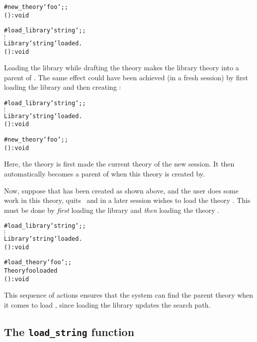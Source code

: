 \setcounter{sessioncount}{1}
\begin{session}\begin{alltt}
#new_theory `foo`;;
() : void

#load_library `string`;;
  \(\vdots\)
Library `string` loaded.
() : void
\end{alltt}\end{session}

\noindent Loading the library while drafting the theory  makes the
library theory  into a parent of .  The same effect could
have been achieved (in a fresh session) by first loading the library and then
creating :

\setcounter{sessioncount}{1}
\begin{session}\begin{alltt}
#load_library `string`;;
  \(\vdots\)
Library `string` loaded.
() : void

#new_theory `foo`;;
() : void
\end{alltt}\end{session}

\noindent Here, the theory  is first made the current theory of the
new session.  It then automatically becomes a parent of  when this
theory is created by\pagebreak[3] .

Now, suppose that  has been created as shown above, and the user does
some work in this theory, quits \HOL\, and in a later session wishes to load
the theory .  This must be done by {\it first\/} loading the
 library and {\it then\/} loading the theory .

\setcounter{sessioncount}{1}
\begin{session}\begin{alltt}
#load_library `string`;;
  \(\vdots\)
Library `string` loaded.
() : void

#load_theory `foo`;;
Theory foo loaded
() : void
\end{alltt}\end{session}

\noindent This sequence of actions ensures that the system can find the parent
theory  when it comes to load , since loading the library
updates the search path.

\subsection{The {\tt load\_string} function}%

